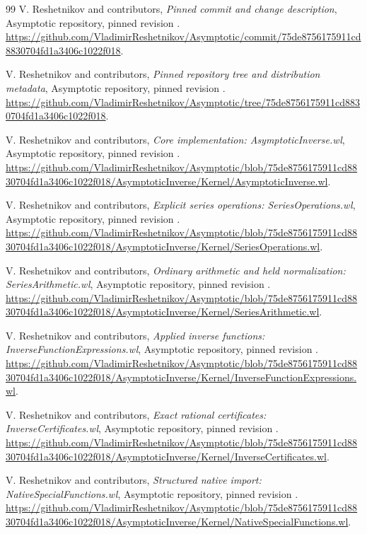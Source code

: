 \clearpage
\begin{thebibliography}{99}
\small
{} V. Reshetnikov and contributors, \emph{Pinned commit and change description}, Asymptotic repository, pinned revision \commit. \url{https://github.com/VladimirReshetnikov/Asymptotic/commit/75de8756175911cd8830704fd1a3406c1022f018}.

 V. Reshetnikov and contributors, \emph{Pinned repository tree and distribution metadata}, Asymptotic repository, pinned revision \commit. \url{https://github.com/VladimirReshetnikov/Asymptotic/tree/75de8756175911cd8830704fd1a3406c1022f018}.

 V. Reshetnikov and contributors, \emph{Core implementation: AsymptoticInverse.wl}, Asymptotic repository, pinned revision \commit. \url{https://github.com/VladimirReshetnikov/Asymptotic/blob/75de8756175911cd8830704fd1a3406c1022f018/AsymptoticInverse/Kernel/AsymptoticInverse.wl}.

 V. Reshetnikov and contributors, \emph{Explicit series operations: SeriesOperations.wl}, Asymptotic repository, pinned revision \commit. \url{https://github.com/VladimirReshetnikov/Asymptotic/blob/75de8756175911cd8830704fd1a3406c1022f018/AsymptoticInverse/Kernel/SeriesOperations.wl}.

 V. Reshetnikov and contributors, \emph{Ordinary arithmetic and held normalization: SeriesArithmetic.wl}, Asymptotic repository, pinned revision \commit. \url{https://github.com/VladimirReshetnikov/Asymptotic/blob/75de8756175911cd8830704fd1a3406c1022f018/AsymptoticInverse/Kernel/SeriesArithmetic.wl}.

 V. Reshetnikov and contributors, \emph{Applied inverse functions: InverseFunctionExpressions.wl}, Asymptotic repository, pinned revision \commit. \url{https://github.com/VladimirReshetnikov/Asymptotic/blob/75de8756175911cd8830704fd1a3406c1022f018/AsymptoticInverse/Kernel/InverseFunctionExpressions.wl}.

 V. Reshetnikov and contributors, \emph{Exact rational certificates: InverseCertificates.wl}, Asymptotic repository, pinned revision \commit. \url{https://github.com/VladimirReshetnikov/Asymptotic/blob/75de8756175911cd8830704fd1a3406c1022f018/AsymptoticInverse/Kernel/InverseCertificates.wl}.

 V. Reshetnikov and contributors, \emph{Structured native import: NativeSpecialFunctions.wl}, Asymptotic repository, pinned revision \commit. \url{https://github.com/VladimirReshetnikov/Asymptotic/blob/75de8756175911cd8830704fd1a3406c1022f018/AsymptoticInverse/Kernel/NativeSpecialFunctions.wl}.


\end{thebibliography}
